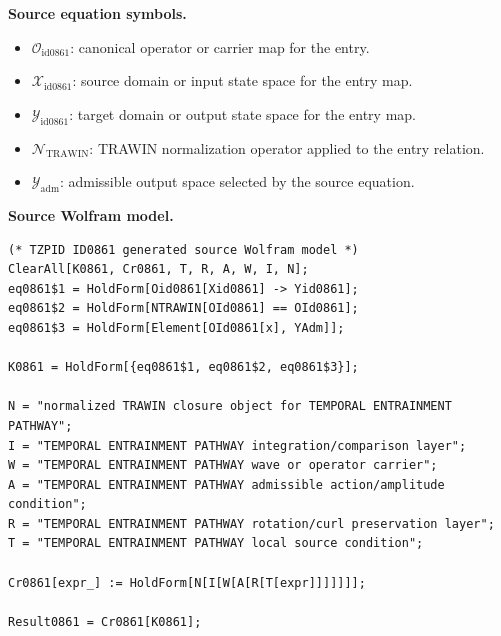 \begin{minipage}[t]{0.49\linewidth}
\begingroup
\small
\raggedright
\textbf{Source equation symbols.}\par
\begin{itemize}[leftmargin=1.35em,itemsep=1pt,topsep=1pt,parsep=0pt]
    \item $\mathcal{O}_{\mathrm{id0861}}$: canonical operator or carrier map for the entry.
    \item $\mathcal{X}_{\mathrm{id0861}}$: source domain or input state space for the entry map.
    \item $\mathcal{Y}_{\mathrm{id0861}}$: target domain or output state space for the entry map.
    \item $\mathcal{N}_{\mathrm{TRAWIN}}$: TRAWIN normalization operator applied to the entry relation.
    \item $\mathcal{Y}_{\mathrm{adm}}$: admissible output space selected by the source equation.
\end{itemize}
\endgroup
\end{minipage}\hfill
\begin{minipage}[t]{0.47\linewidth}
\begingroup
\scriptsize
\raggedright
\textbf{Source Wolfram model.}\par
\begin{Verbatim}[fontsize=\tiny,breaklines=true,breakanywhere=true]
(* TZPID ID0861 generated source Wolfram model *)
ClearAll[K0861, Cr0861, T, R, A, W, I, N];
eq0861$1 = HoldForm[Oid0861[Xid0861] -> Yid0861];
eq0861$2 = HoldForm[NTRAWIN[OId0861] == OId0861];
eq0861$3 = HoldForm[Element[OId0861[x], YAdm]];

K0861 = HoldForm[{eq0861$1, eq0861$2, eq0861$3}];

N = "normalized TRAWIN closure object for TEMPORAL ENTRAINMENT PATHWAY";
I = "TEMPORAL ENTRAINMENT PATHWAY integration/comparison layer";
W = "TEMPORAL ENTRAINMENT PATHWAY wave or operator carrier";
A = "TEMPORAL ENTRAINMENT PATHWAY admissible action/amplitude condition";
R = "TEMPORAL ENTRAINMENT PATHWAY rotation/curl preservation layer";
T = "TEMPORAL ENTRAINMENT PATHWAY local source condition";

Cr0861[expr_] := HoldForm[N[I[W[A[R[T[expr]]]]]]];

Result0861 = Cr0861[K0861];
\end{Verbatim}
\endgroup
\end{minipage}

